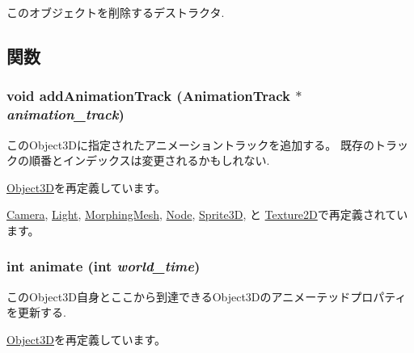 このオブジェクトを削除するデストラクタ. 

\subsection{関数}
\hypertarget{classm3g_1_1Transformable_415c0b110f95410ded9b85e5d99a496b}{
\subsubsection[{addAnimationTrack}]{\setlength{\rightskip}{0pt plus 5cm}void addAnimationTrack ({\bf AnimationTrack} $\ast$ {\em animation\_\-track})}}
\label{classm3g_1_1Transformable_415c0b110f95410ded9b85e5d99a496b}


このObject3Dに指定されたアニメーショントラックを追加する。 既存のトラックの順番とインデックスは変更されるかもしれない. 

\hyperlink{classm3g_1_1Object3D_415c0b110f95410ded9b85e5d99a496b}{Object3D}を再定義しています。

\hyperlink{classm3g_1_1Camera_415c0b110f95410ded9b85e5d99a496b}{Camera}, \hyperlink{classm3g_1_1Light_415c0b110f95410ded9b85e5d99a496b}{Light}, \hyperlink{classm3g_1_1MorphingMesh_415c0b110f95410ded9b85e5d99a496b}{MorphingMesh}, \hyperlink{classm3g_1_1Node_415c0b110f95410ded9b85e5d99a496b}{Node}, \hyperlink{classm3g_1_1Sprite3D_415c0b110f95410ded9b85e5d99a496b}{Sprite3D}, と \hyperlink{classm3g_1_1Texture2D_415c0b110f95410ded9b85e5d99a496b}{Texture2D}で再定義されています。\hypertarget{classm3g_1_1Transformable_8aad1ceab4c2a03609c8a42324ce484d}{
\subsubsection[{animate}]{\setlength{\rightskip}{0pt plus 5cm}int animate (int {\em world\_\-time})}}
\label{classm3g_1_1Transformable_8aad1ceab4c2a03609c8a42324ce484d}


このObject3D自身とここから到達できるObject3Dのアニメーテッドプロパティを更新する. 

\hyperlink{classm3g_1_1Object3D_8aad1ceab4c2a03609c8a42324ce484d}{Object3D}を再定義しています。

